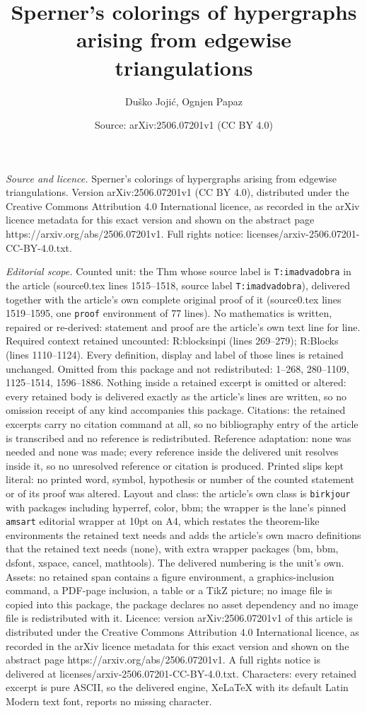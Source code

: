 \documentclass[10pt,a4paper]{amsart}
\title[Sperner's colorings of hypergraphs arising from edgewise tri]{Sperner's colorings of hypergraphs arising from edgewise triangulations}
\author{Du\v{s}ko Joji\'c, Ognjen Papaz}
\date{Source: arXiv:2506.07201v1 (CC BY 4.0)}
\begin{document}
\maketitle

\noindent\emph{Source and licence.} Sperner's colorings of hypergraphs arising from edgewise triangulations. Version arXiv:2506.07201v1 (CC BY 4.0), distributed under the Creative Commons Attribution 4.0 International licence, as recorded in the arXiv licence metadata for this exact version and shown on the abstract page https://arxiv.org/abs/2506.07201v1. Full rights notice: licenses/arxiv-2506.07201-CC-BY-4.0.txt.\par\smallskip

\noindent\textit{Editorial scope.} Counted unit: the Thm whose source label is \texttt{T:imadvadobra} in the article (source0.tex lines 1515--1518, source label \texttt{T:imadvadobra}), delivered together with the article's own complete original proof of it (source0.tex lines 1519--1595, one \texttt{proof} environment of 77 lines). No mathematics is written, repaired or re-derived: statement and proof are the article's own text line for line. Required context retained uncounted: R:blocksinpi (lines 269--279); R:Blocks (lines 1110--1124). Every definition, display and label of those lines is retained unchanged. Omitted from this package and not redistributed: 1--268, 280--1109, 1125--1514, 1596--1886. Nothing inside a retained excerpt is omitted or altered: every retained body is delivered exactly as the article's lines are written, so no omission receipt of any kind accompanies this package. Citations: the retained excerpts carry no citation command at all, so no bibliography entry of the article is transcribed and no reference is redistributed. Reference adaptation: none was needed and none was made; every reference inside the delivered unit resolves inside it, so no unresolved reference or citation is produced. Printed slips kept literal: no printed word, symbol, hypothesis or number of the counted statement or of its proof was altered. Layout and class: the article's own class is \texttt{birkjour} with packages including hyperref, color, bbm; the wrapper is the lane's pinned \texttt{amsart} editorial wrapper at 10pt on A4, which restates the theorem-like environments the retained text needs and adds the article's own macro definitions that the retained text needs (none), with extra wrapper packages (bm, bbm, dsfont, xspace, cancel, mathtools). The delivered numbering is the unit's own. Assets: no retained span contains a figure environment, a graphics-inclusion command, a PDF-page inclusion, a table or a TikZ picture; no image file is copied into this package, the package declares no asset dependency and no image file is redistributed with it. Licence: version arXiv:2506.07201v1 of this article is distributed under the Creative Commons Attribution 4.0 International licence, as recorded in the arXiv licence metadata for this exact version and shown on the abstract page https://arxiv.org/abs/2506.07201v1. A full rights notice is delivered at licenses/arxiv-2506.07201-CC-BY-4.0.txt. Characters: every retained excerpt is pure ASCII, so the delivered engine, XeLaTeX with its default Latin Modern text font, reports no missing character.
\end{document}
